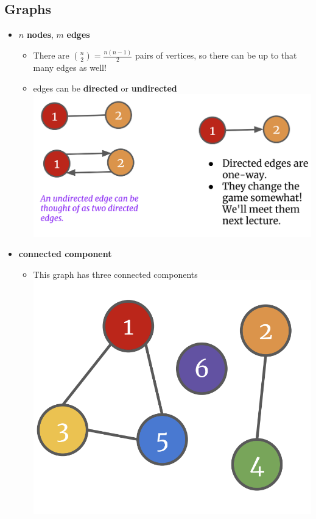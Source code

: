 \documentclass[12pt]{article}
\begin{document}
\subsection*{Graphs}
\begin{itemize}
    \item $n$ \textbf{nodes}, $m$ \textbf{edges}
        \begin{itemize}
        \item There are $\binom{n}{2} = \frac{n(n-1)}{2}$ pairs of vertices, so there can be up to that many edges as well!
        \item edges can be \textbf{directed} or \textbf{undirected}
        \\ \includegraphics[scale=0.2]{directed.png}
        \end{itemize}
    \item \textbf{connected component}
        \begin{itemize}
            \item This graph has three connected components \\ \includegraphics[scale=0.2]{connectedcomponent1.png}

\end{itemize}
\end{itemize}
\end{document}
